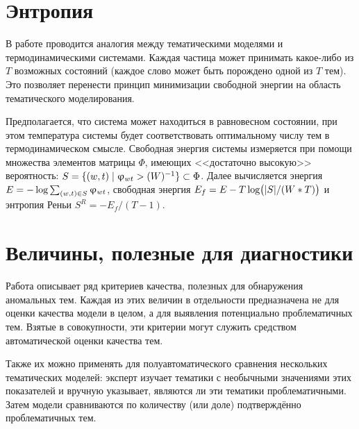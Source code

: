 \section{Энтропия} 

В работе \cite{koltcov2018application} проводится аналогия между тематическими моделями и термодинамическими системами. Каждая частица может принимать какое-либо из $T$ возможных состояний (каждое слово может быть порождено одной из $T$ тем). Это позволяет перенести принцип минимизации свободной энергии на область тематического моделирования.

Предполагается, что система может находиться в равновесном состоянии, при этом температура системы будет соответствовать оптимальному числу тем в термодинамическом смысле. Свободная энергия системы измеряется при помощи множества элементов матрицы $\Phi$, имеющих <<достаточно высокую>> вероятность: $S \hm= \{(w, t) \hm\mid \phi_{wt} \hm> (W)^{-1} \} \hm\subset \Phi$. Далее вычисляется энергия $E \hm= -\log \sum_{(w,t) \in S} \phi_{wt}$, свободная энергия  $E_f \hm= E - T \log\bigl(|S| / (W * T)\bigr)$ и энтропия Реньи $S^R = -E_f / (T - 1)$.

\section{Величины, полезные для диагностики}

Работа \cite{boydcare} описывает ряд критериев качества, полезных для обнаружения аномальных тем. Каждая из этих величин в отдельности предназначена не для оценки качества модели в целом, а для выявления потенциально проблематичных тем. Взятые в совокупности, эти критерии могут служить средством автоматической оценки качества тем. 

Также их можно применять для полуавтоматического сравнения нескольких тематических моделей: эксперт изучает тематики с необычными значениями этих показателей и вручную указывает, являются ли эти тематики проблематичными. Затем модели сравниваются по количеству (или доле) подтверждённо проблематичных тем.

